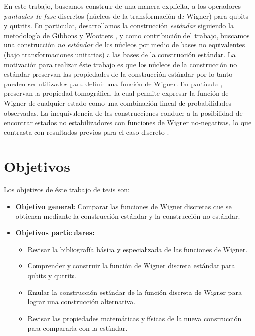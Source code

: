 \documentclass[a4paper]{article}
\begin{document}
  En este trabajo, buscamos construir de una manera
  explícita, a los operadores \textit{puntuales de fase}
  discretos (núcleos de la transformación de Wigner) para
  qubits y qutrits. En particular, desarrollamos la
  construcción \textit{estándar} siguiendo la metodología de
  Gibbons y Wootters \cite{wootters1987}, y como
  contribución del trabajo, buscamos una construcción
  \textit{no estándar} de los núcleos por medio de bases no
  equivalentes (bajo transformaciones unitarias) a las bases
  de la construcción estándar. La motivación para realizar
  éste trabajo es que los núcleos de la construcción no
  estándar preservan las propiedades de la construcción
  estándar por lo tanto pueden ser utilizados para definir
  una función de Wigner. En particular, preservan la
  propiedad tomográfica, la cual permite expresar la función
  de Wigner de cualquier estado como una combinación lineal
  de probabilidades observadas. La inequivalencia de las
  construcciones conduce a la posibilidad de encontrar
  estados no estabilizadores con funciones de Wigner
  no-negativas, lo que contrasta con resultados previos para
  el caso discreto \cite{gross2006, galvao2005,
  cormick2006a}.

  \section{Objetivos}

  Los objetivos de éste trabajo de tesis son:
  \begin{itemize}
    \item \textbf{Objetivo general:} Comparar las funciones
      de Wigner discretas que se obtienen mediante la
      construcción estándar y la construcción no estándar.
    \item \textbf{Objetivos particulares:}
      \begin{itemize}
        \item Revisar la bibliografía básica y especializada
          de las funciones de Wigner.
        \item Comprender y construir la función de Wigner
          discreta estándar para qubits y qutrits.
        \item Emular la construcción estándar de la función
          discreta de Wigner para lograr una construcción
          alternativa.
        \item Revisar las propiedades matemáticas y físicas
          de la nueva construcción para compararla con la
          estándar.
      \end{itemize}
  \end{itemize}
\end{document}

